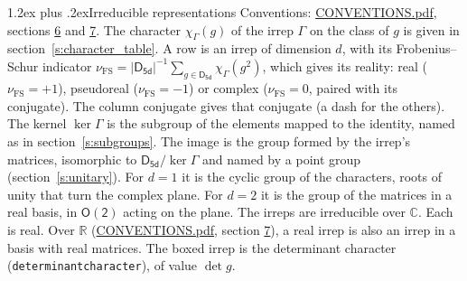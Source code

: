 \documentclass[10pt,a4paper]{article}
\makeatletter
\renewcommand\section{\@startsection{section}{1}{\z@}{-3ex plus -1ex minus -.2ex}%
  {1.2ex plus .2ex}{\normalfont\large\sffamily\bfseries\color{parttitle}}}
\numberwithin{equation}{section}
\newcommand{\grp}[1]{\mathsf{#1}}
\newcommand{\irchar}[1]{\chi_{#1}}
\newcommand{\fsind}{\nu_{\mathrm{FS}}}
\makeatother
\begin{document}
\section{Irreducible representations}\label{s:irreps}
Conventions: \href{../../CONVENTIONS.pdf}{CONVENTIONS.pdf}, sections \href{../../CONVENTIONS.pdf\#conv.6}{6} and \href{../../CONVENTIONS.pdf\#conv.7}{7}.
\leavevmode\label{n:function.character}\label{n:irrep.Gamma}The character $\irchar{\Gamma}(g)$ of the irrep $\Gamma$ on the class of $g$ is given in section~\ref{s:character_table}.
\leavevmode\label{n:index.dimension}\label{n:index.frobenius}\label{n:head.irrep}\label{n:head.reality}A row is an irrep of dimension $d$, with its Frobenius--Schur indicator $\fsind = |\grp{D_{5d}}|^{-1}\allowbreak\sum_{g\in\grp{D_{5d}}}\irchar{\Gamma}(g^2)$, which gives its reality: real ($\fsind = +1$), pseudoreal ($\fsind = -1$) or complex ($\fsind = 0$, paired with its conjugate). \label{n:head.conjugate}The column conjugate gives that conjugate (a dash for the others). \label{n:head.kernel}The kernel $\ker\Gamma$ is the subgroup of the elements mapped to the identity, named as in section~\ref{s:subgroups}. \label{n:head.image}The image is the group formed by the irrep's matrices, isomorphic to $\grp{D_{5d}}/\ker\Gamma$ and named by a point group (section~\ref{s:unitary}). For $d = 1$ it is the cyclic group of the characters, roots of unity that turn the complex plane. For $d = 2$ it is the group of the matrices in a real basis, in $\grp{O(2)}$ acting on the plane. The irreps are irreducible over $\mathbb{C}$. Each is real. Over $\mathbb{R}$ (\href{../../CONVENTIONS.pdf}{CONVENTIONS.pdf}, section \href{../../CONVENTIONS.pdf\#conv.7}{7}), a real irrep is also an irrep in a basis with real matrices. \label{n:mark.determinant}The boxed irrep is the determinant character (\texttt{determinantcharacter}), of value $\det g$.
\setlength{\emergencystretch}{2em}\par\setlength{\emergencystretch}{0pt}
\end{document}
